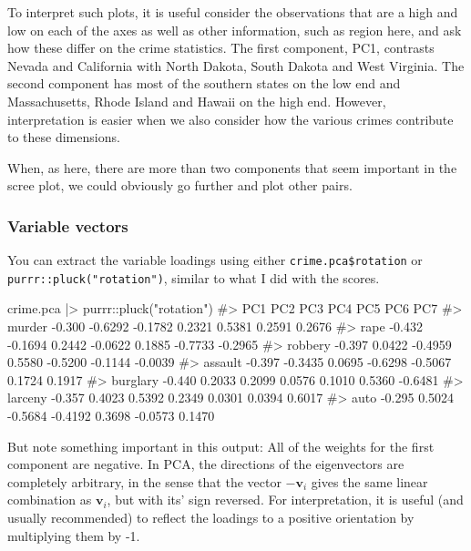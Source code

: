 \documentclass[
  letterpaper,
  10pt,
  krantz2]{krantz}
\makeatletter
\newenvironment{Shaded}{\begin{snugshade}}{\end{snugshade}}
\newcommand{\CommentTok}[1]{\textcolor[rgb]{0.37,0.37,0.37}{#1}}
\newcommand{\FunctionTok}[1]{\textcolor[rgb]{0.28,0.35,0.67}{#1}}
\newcommand{\NormalTok}[1]{\textcolor[rgb]{0.00,0.23,0.31}{#1}}
\newcommand{\SpecialCharTok}[1]{\textcolor[rgb]{0.37,0.37,0.37}{#1}}
\newcommand{\StringTok}[1]{\textcolor[rgb]{0.13,0.47,0.30}{#1}}
\newenvironment{kframe}{%
  \medskip{}
  \setlength{\fboxsep}{.8em}
  \def\at@end@of@kframe{}%
  \ifinner\ifhmode%
  \def\at@end@of@kframe{\end{minipage}}%
  \begin{minipage}{\columnwidth}%
  \fi\fi%
  \def\FrameCommand##1{\hskip\@totalleftmargin \hskip-\fboxsep
  \colorbox{shadecolor}{##1}\hskip-\fboxsep
      \hskip-\linewidth \hskip-\@totalleftmargin \hskip\columnwidth}%
  \MakeFramed {\advance\hsize-\width
    \@totalleftmargin\z@ \linewidth\hsize
    \@setminipage}}%
{\par\unskip\endMakeFramed%
  \at@end@of@kframe}
\renewenvironment{Shaded}{\begin{kframe}}{\end{kframe}}
\makeatother
\begin{document}
To interpret such plots, it is useful consider the observations that are
a high and low on each of the axes as well as other information, such as
region here, and ask how these differ on the crime statistics. The first
component, PC1, contrasts Nevada and California with North Dakota, South
Dakota and West Virginia. The second component has most of the southern
states on the low end and Massachusetts, Rhode Island and Hawaii on the
high end. However, interpretation is easier when we also consider how
the various crimes contribute to these dimensions.

When, as here, there are more than two components that seem important in
the scree plot, we could obviously go further and plot other pairs.

\hypertarget{variable-vectors}{%
\subsubsection*{Variable vectors}\label{variable-vectors}}

You can extract the variable loadings using either
\texttt{crime.pca\$rotation} or \texttt{purrr::pluck("rotation")},
similar to what I did with the scores.

\begin{Shaded}
\begin{Highlighting}[]
\NormalTok{crime.pca }\SpecialCharTok{|\textgreater{}}\NormalTok{ purrr}\SpecialCharTok{::}\FunctionTok{pluck}\NormalTok{(}\StringTok{"rotation"}\NormalTok{)}
\CommentTok{\#\textgreater{}             PC1     PC2     PC3     PC4     PC5     PC6     PC7}
\CommentTok{\#\textgreater{} murder   {-}0.300 {-}0.6292 {-}0.1782  0.2321  0.5381  0.2591  0.2676}
\CommentTok{\#\textgreater{} rape     {-}0.432 {-}0.1694  0.2442 {-}0.0622  0.1885 {-}0.7733 {-}0.2965}
\CommentTok{\#\textgreater{} robbery  {-}0.397  0.0422 {-}0.4959  0.5580 {-}0.5200 {-}0.1144 {-}0.0039}
\CommentTok{\#\textgreater{} assault  {-}0.397 {-}0.3435  0.0695 {-}0.6298 {-}0.5067  0.1724  0.1917}
\CommentTok{\#\textgreater{} burglary {-}0.440  0.2033  0.2099  0.0576  0.1010  0.5360 {-}0.6481}
\CommentTok{\#\textgreater{} larceny  {-}0.357  0.4023  0.5392  0.2349  0.0301  0.0394  0.6017}
\CommentTok{\#\textgreater{} auto     {-}0.295  0.5024 {-}0.5684 {-}0.4192  0.3698 {-}0.0573  0.1470}
\end{Highlighting}
\end{Shaded}

But note something important in this output: All of the weights for the
first component are negative. In PCA, the directions of the eigenvectors
are completely arbitrary, in the sense that the vector \(-\mathbf{v}_i\)
gives the same linear combination as \(\mathbf{v}_i\), but with its'
sign reversed. For interpretation, it is useful (and usually
recommended) to reflect the loadings to a positive orientation by
multiplying them by -1.
\end{document}
